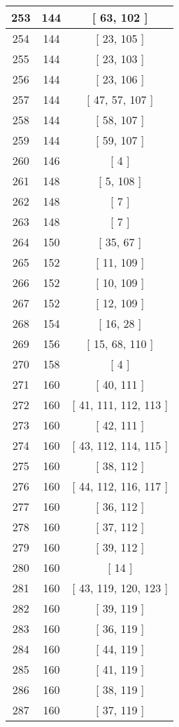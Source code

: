 \begin{center}
\begin{longtable}[H]{|| c c c ||}
\hline
253 & 144 & [ 63, 102 ] \\ 
\hline
254 & 144 & [ 23, 105 ] \\ 
\hline
255 & 144 & [ 23, 103 ] \\ 
\hline
256 & 144 & [ 23, 106 ] \\ 
\hline
257 & 144 & [ 47, 57, 107 ] \\ 
\hline
258 & 144 & [ 58, 107 ] \\ 
\hline
259 & 144 & [ 59, 107 ] \\ 
\hline
260 & 146 & [ 4 ] \\ 
\hline
261 & 148 & [ 5, 108 ] \\ 
\hline
262 & 148 & [ 7 ] \\ 
\hline
263 & 148 & [ 7 ] \\ 
\hline
264 & 150 & [ 35, 67 ] \\ 
\hline
265 & 152 & [ 11, 109 ] \\ 
\hline
266 & 152 & [ 10, 109 ] \\ 
\hline
267 & 152 & [ 12, 109 ] \\ 
\hline
268 & 154 & [ 16, 28 ] \\ 
\hline
269 & 156 & [ 15, 68, 110 ] \\ 
\hline
270 & 158 & [ 4 ] \\ 
\hline
271 & 160 & [ 40, 111 ] \\ 
\hline
272 & 160 & [ 41, 111, 112, 113 ] \\ 
\hline
273 & 160 & [ 42, 111 ] \\ 
\hline
274 & 160 & [ 43, 112, 114, 115 ] \\ 
\hline
275 & 160 & [ 38, 112 ] \\ 
\hline
276 & 160 & [ 44, 112, 116, 117 ] \\ 
\hline
277 & 160 & [ 36, 112 ] \\ 
\hline
278 & 160 & [ 37, 112 ] \\ 
\hline
279 & 160 & [ 39, 112 ] \\ 
\hline
280 & 160 & [ 14 ] \\ 
\hline
281 & 160 & [ 43, 119, 120, 123 ] \\ 
\hline
282 & 160 & [ 39, 119 ] \\ 
\hline
283 & 160 & [ 36, 119 ] \\ 
\hline
284 & 160 & [ 44, 119 ] \\ 
\hline
285 & 160 & [ 41, 119 ] \\ 
\hline
286 & 160 & [ 38, 119 ] \\ 
\hline
287 & 160 & [ 37, 119 ] \\ 

\end{longtable}
\end{center}
